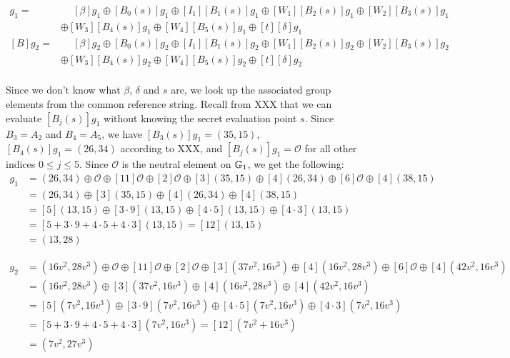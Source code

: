 \begin{example}
\begin{align*}
[B]g_1 = &\phantom{\oplus} [\beta]g_1 \oplus [B_0(s)]g_1 \oplus [I_1][B_1(s)]g_1\oplus [W_1][B_2(s)]g_1 \oplus [W_2][B_3(s)]g_1\\ 
       & \oplus [W_3][B_4(s)]g_1\oplus [W_4][B_5(s)]g_1\oplus [t][\delta]g_1\\
[B]g_2 = &\phantom{\oplus} [\beta]g_2 \oplus [B_0(s)]g_2 \oplus [I_1][B_1(s)]g_2\oplus [W_1][B_2(s)]g_2 \oplus [W_2][B_3(s)]g_2\\ 
       & \oplus [W_3][B_4(s)]g_2\oplus [W_4][B_5(s)]g_2\oplus [t][\delta]g_2\\       
\end{align*}

Since we don't know what $\beta$, $\delta$ and $s$ are, we look up the associated group elements from the common reference string. Recall from XXX that we can evaluate $[B_j(s)]g_1$ without knowing the secret evaluation point $s$. Since $B_3=A_2$ and $B_4=A_5$, we have $[B_3(s)]g_1=(35,15)$, $[B_4(s)]g_1=(26,34)$ according to XXX, and $[B_j(s)]g_1=\mathcal{O}$ for all other indices $0\leq j\leq 5$. Since $\mathcal{O}$ is the neutral element on $\mathbb{G}_1$, we get the following:
\begin{align*}
[B]g_1 &= (26,34) \oplus \mathcal{O}\oplus [11]\mathcal{O}\oplus [2]\mathcal{O} \oplus [3](35,15) \oplus [4](26,34)\oplus [6]\mathcal{O}\oplus [4](38,15)\\    
       &= (26,34)\oplus [3](35,15) \oplus [4](26,34)\oplus [4](38,15)\\  
       &= [5](13,15)\oplus [3\cdot 9](13,15) \oplus [4\cdot 5](13,15)\oplus [4\cdot 3](13,15)\\        
       &= [5+3\cdot 9+4\cdot 5+4\cdot 3](13,15) = [12](13,15) \\
       &= (13,28)
\end{align*}

\begin{align*}
[B]g_2 &=(16v^2,28v^3) \oplus \mathcal{O} \oplus [11]\mathcal{O}\oplus [2]\mathcal{O} \oplus [3](37v^2,16v^3)\oplus [4](16v^2,28v^3)\oplus [6]\mathcal{O}\oplus [4](42v^2,16v^3)\\    
         &=(16v^2,28v^3)\oplus [3](37v^2,16v^3)\oplus [4](16v^2,28v^3)\oplus [4](42v^2,16v^3)\\
         &=[5](7v^2,16v^3)\oplus [3\cdot 9](7v^2,16v^3)\oplus [4\cdot 5](7v^2,16v^3)\oplus [4\cdot 3](7v^2,16v^3)\\          
         &=[5+3\cdot 9+4\cdot 5+4\cdot 3](7v^2,16v^3)=[12](7v^2+16v^3)\\
         &= (7v^2,27v^3)     
\end{align*}


\end{example}
